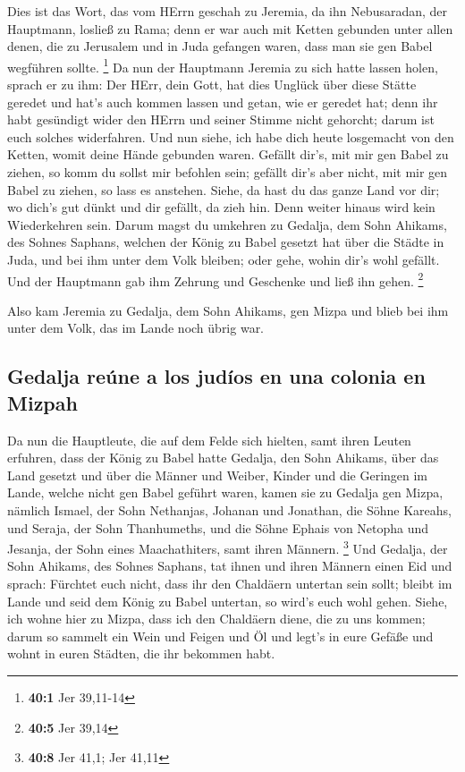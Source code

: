  Dies ist das Wort, das vom HErrn geschah zu Jeremia, da
ihn Nebusaradan, der Hauptmann, losließ zu Rama; denn er war auch mit
Ketten gebunden unter allen denen, die zu Jerusalem und in Juda gefangen
waren, dass man sie gen Babel wegführen sollte. \footnote{\textbf{40:1}
  Jer 39,11-14}  Da nun der Hauptmann Jeremia zu sich
hatte lassen holen, sprach er zu ihm: Der HErr, dein Gott, hat dies
Unglück über diese Stätte geredet  und hat's auch kommen
lassen und getan, wie er geredet hat; denn ihr habt gesündigt wider den
HErrn und seiner Stimme nicht gehorcht; darum ist euch solches
widerfahren.  Und nun siehe, ich habe dich heute
losgemacht von den Ketten, womit deine Hände gebunden waren. Gefällt
dir's, mit mir gen Babel zu ziehen, so komm du sollst mir befohlen sein;
gefällt dir's aber nicht, mit mir gen Babel zu ziehen, so lass es
anstehen. Siehe, da hast du das ganze Land vor dir; wo dich's gut dünkt
und dir gefällt, da zieh hin.  Denn weiter hinaus wird
kein Wiederkehren sein. Darum magst du umkehren zu Gedalja, dem Sohn
Ahikams, des Sohnes Saphans, welchen der König zu Babel gesetzt hat über
die Städte in Juda, und bei ihm unter dem Volk bleiben; oder gehe, wohin
dir's wohl gefällt. Und der Hauptmann gab ihm Zehrung und Geschenke und
ließ ihn gehen. \footnote{\textbf{40:5} Jer 39,14}

 Also kam Jeremia zu Gedalja, dem Sohn Ahikams, gen Mizpa
und blieb bei ihm unter dem Volk, das im Lande noch übrig war.

\hypertarget{gedalja-reuxfane-a-los-juduxedos-en-una-colonia-en-mizpah}{%
\subsection{Gedalja reúne a los judíos en una colonia en
Mizpah}\label{gedalja-reuxfane-a-los-juduxedos-en-una-colonia-en-mizpah}}

 Da nun die Hauptleute, die auf dem Felde sich hielten,
samt ihren Leuten erfuhren, dass der König zu Babel hatte Gedalja, den
Sohn Ahikams, über das Land gesetzt und über die Männer und Weiber,
Kinder und die Geringen im Lande, welche nicht gen Babel geführt waren,
 kamen sie zu Gedalja gen Mizpa, nämlich Ismael, der Sohn
Nethanjas, Johanan und Jonathan, die Söhne Kareahs, und Seraja, der Sohn
Thanhumeths, und die Söhne Ephais von Netopha und Jesanja, der Sohn
eines Maachathiters, samt ihren Männern. \footnote{\textbf{40:8} Jer
  41,1; Jer 41,11}  Und Gedalja, der Sohn Ahikams, des
Sohnes Saphans, tat ihnen und ihren Männern einen Eid und sprach:
Fürchtet euch nicht, dass ihr den Chaldäern untertan sein sollt; bleibt
im Lande und seid dem König zu Babel untertan, so wird's euch wohl
gehen.  Siehe, ich wohne hier zu Mizpa, dass ich den
Chaldäern diene, die zu uns kommen; darum so sammelt ein Wein und Feigen
und Öl und legt's in eure Gefäße und wohnt in euren Städten, die ihr
bekommen habt.

